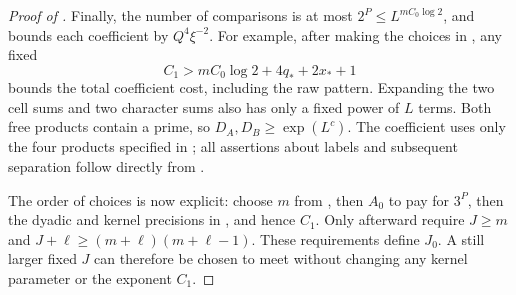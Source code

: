\begin{proof}[Proof of ]
Finally, the number of comparisons is at most
$2^P\leq L^{mC_0\log2}$, and
 bounds each coefficient by
$Q^4\xi^{-2}$.  For example, after making the choices in
, any fixed
\[
 C_1>mC_0\log2+4q_*+2x_*+1
\]
bounds the total coefficient cost, including the raw
pattern.  Expanding the two cell sums and two character
sums also has only a fixed power of $L$ terms.  Both free
products contain a prime, so $D_A,D_B\geq\exp(L^c)$.
The coefficient uses only the four products specified in
; all assertions
about labels and subsequent separation follow directly
from .

The order of choices is now explicit: choose $m$ from
, then $A_0$ to pay for
$3^P$, then the dyadic and kernel precisions in
, and hence $C_1$.
Only afterward require $J\geq m$ and
$J+\ell\geq(m+\ell)(m+\ell-1)$.  These requirements
define $J_0$.  A still larger fixed $J$ can therefore be
chosen to meet  without changing
any kernel parameter or the exponent $C_1$.
\end{proof}
